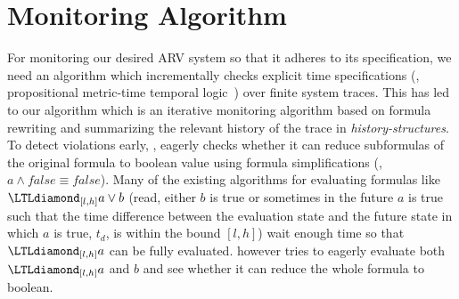 
\section{Monitoring Algorithm}

For monitoring our desired ARV system so that it adheres to its specification, 
we need an algorithm which %
incrementally checks explicit time specifications (\ie, propositional metric-time temporal logic~\cite{Koymans1990}) over finite system traces. 
This has led to our algorithm \monitor which is an iterative monitoring algorithm based on formula rewriting and summarizing the relevant history of the trace 
in \emph{history-structures}. To detect violations early, \monitor, eagerly checks whether it can reduce subformulas of the original formula to boolean value 
using formula simplifications (\eg, $a\wedge \mathit{false} \equiv \mathit{false}$). 
Many of the existing algorithms for evaluating formulas like $\eventually_{[l,h]} a \vee b$ (read, either $b$ is true or sometimes in the future $a$ is true such that the time difference between the evaluation state and the future state in which $a$ is true, $t_d$, is within the bound $[l,h]$) wait enough time so that $\eventually_{[l,h]} a$ can be fully evaluated. 
\monitor however tries to eagerly evaluate both $\eventually_{[l,h]} a$ and $b$ and see whether it can reduce the whole formula to boolean.
%

